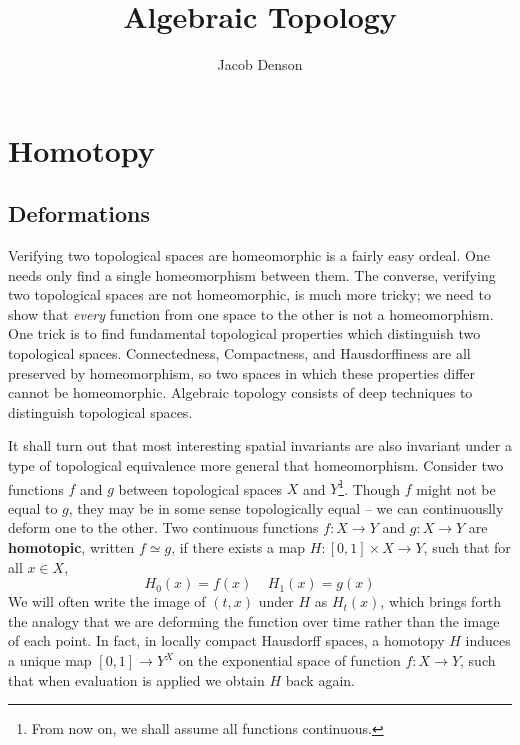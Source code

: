 

\DeclareMathOperator{\Dom}{Dom}

\title{Algebraic Topology}
\author{Jacob Denson}




\maketitle

\tableofcontents


\chapter{Homotopy}

\section{Deformations}

Verifying two topological spaces are homeomorphic is a fairly easy ordeal. One needs only find a single homeomorphism between them. The converse, verifying two topological spaces are not homeomorphic, is much more tricky; we need to show that {\it every} function from one space to the other is not a homeomorphism. One trick is to find fundamental topological properties which distinguish two topological spaces. Connectedness, Compactness, and Hausdorffiness are all preserved by homeomorphism, so two spaces in which these properties differ cannot be homeomorphic. Algebraic topology consists of deep techniques to distinguish topological spaces.

It shall turn out that most interesting spatial invariants are also invariant under a type of topological equivalence more general that homeomorphism. Consider two functions $f$ and $g$ between topological spaces $X$ and $Y$\footnote{From now on, we shall assume all functions continuous.}. Though $f$ might not be equal to $g$, they may be in some sense topologically equal -- we can continuouslly deform one to the other. Two continuous functions $f: X \to Y$ and $g:X \to Y$ are {\bf homotopic}, written $f \simeq g$, if there exists a map $H: [0,1] \times X \to Y$, such that for all $x \in X$,
%
\[ H_0(x) = f(x)\ \ \ \ \ H_1(x) = g(x) \]
%
We will often write the image of $(t,x)$ under $H$ as $H_t(x)$, which brings forth the analogy that we are deforming the function over time rather than the image of each point. In fact, in locally compact Hausdorff spaces, a homotopy $H$ induces a unique map $[0,1] \to Y^X$ on the exponential space of function $f:X \to Y$, such that when evaluation is applied we obtain $H$ back again.


